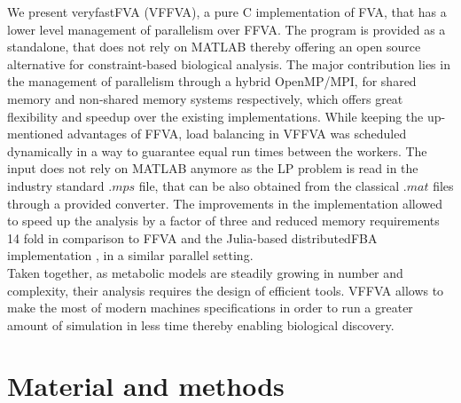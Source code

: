 We present veryfastFVA (VFFVA), a pure C implementation of FVA, that has a lower level management of parallelism over FFVA. The program is provided as a standalone, that does not rely on MATLAB thereby offering an open source alternative for constraint-based biological analysis. The major contribution lies in the management of parallelism through a hybrid OpenMP/MPI, for shared memory and non-shared memory systems respectively, which offers great flexibility and speedup over the existing implementations. While keeping the up-mentioned advantages of FFVA, load balancing in VFFVA was scheduled dynamically \cite{suss2008common} in a way to guarantee equal run times between the workers. The input does not rely on MATLAB anymore as the LP problem is read in the industry standard $.mps$ file, that can be also obtained from the classical $.mat$ files through a provided converter. The improvements in the implementation allowed to speed up the analysis by a factor of three  and reduced memory requirements 14 fold in comparison to FFVA and the Julia-based distributedFBA implementation \cite{heirendt2016distributedfba}, in a similar parallel setting.\\
Taken together, as metabolic models are steadily growing in number and complexity, their analysis requires the design of efficient tools. VFFVA allows to make the most of modern machines specifications in order to run a greater amount of simulation in less time thereby enabling biological discovery. 
\section*{Material and methods}
